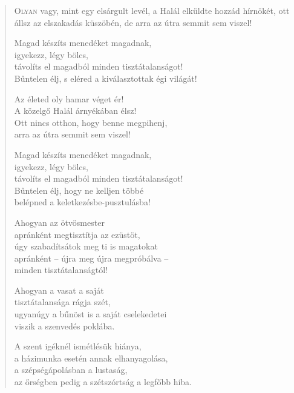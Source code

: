 
\begin{verse}

{\par%
\lettrine{O}{lyan} {\LettrineTextFont vagy, mint egy elsárgult levél,}\newline
a Halál elküldte hozzád hírnökét,\newline
ott állsz az elszakadás küszöbén,\verselinebreak
de arra az útra semmit sem viszel!
\par}

 Magad készíts menedéket magadnak,\\
igyekezz, légy bölcs,\\
távolíts el magadból minden tisztátalanságot!\\
Bűntelen élj, s eléred a kiválasztottak égi világát!

 Az életed oly hamar véget ér!\\
A közelgő Halál árnyékában élsz!\\
Ott nincs otthon, hogy benne megpihenj,\\
arra az útra semmit sem viszel!

 Magad készíts menedéket magadnak,\\
igyekezz, légy bölcs,\\
távolíts el magadból minden tisztátalanságot!\\
Bűntelen élj, hogy ne kelljen többé\\
belépned a keletkezésbe-pusztulásba!

 Ahogyan az ötvösmester\\
apránként megtisztítja az ezüstöt,\\
úgy szabadítsátok meg ti is magatokat\\
apránként – újra meg újra megpróbálva –\\
minden tisztátalanságtól!

 Ahogyan a vasat a saját\\
tisztátalansága rágja szét,\\
ugyanúgy a bűnöst is a saját cselekedetei\\
viszik a szenvedés poklába.

 A szent igéknél ismétlésük hiánya,\\
a házimunka esetén annak elhanyagolása,\\
a szépségápolásban a lustaság,\\
az őrségben pedig a szétszórtság a legfőbb hiba.


\end{verse}
